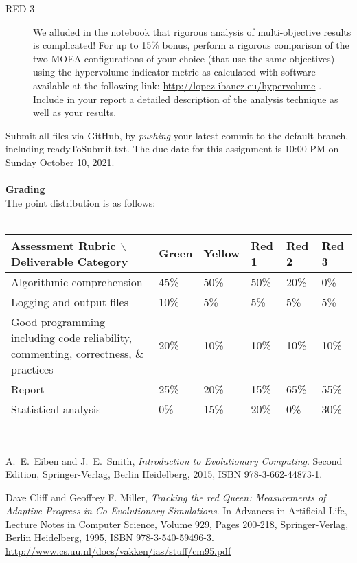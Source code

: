 \documentclass{article}
\begin{document}
\begin{description}
\item[RED 3] We alluded in the notebook that rigorous analysis of multi-objective results is complicated! For up to 15\% bonus, perform a rigorous comparison of the two MOEA configurations of your choice (that use the same objectives) using the hypervolume indicator metric as calculated with software available at the following link: \url{http://lopez-ibanez.eu/hypervolume} . Include in your report a detailed description of the analysis technique as well as your results.
\end{description}
Submit all files via GitHub, by \emph{pushing} your latest commit to the default branch, including readyToSubmit.txt. The due date for this assignment is 10:00 PM on Sunday October 10, 2021.
\\
\\
\textbf{Grading}\\
The point distribution is as follows:\\
\\
\begin{tabular}{p{20em}|l|l|l|l|l|}
  Assessment Rubric $\backslash$ Deliverable Category   & Green     & Yellow        & Red 1     & Red 2     & Red 3\\ \hline \hline  
  Algorithmic comprehension                             & 45\%      & 50\%          & 50\%      & 20\%      & 0\%\\
  \hline Logging and output files                       & 10\%      & 5\%           & 5\%       & 5\%       & 5\%\\
  \hline Good programming including code reliability, commenting, correctness, \& practices      & 20\%  & 10\% & 10\%  & 10\%   & 10\%\\
  \hline Report                                         & 25\%      & 20\%          & 15\%      & 65\%      & 55\%\\
  \hline Statistical analysis                           & 0\%       & 15\%          & 20\%      & 0\%       & 30\%\\
\end{tabular}\\

\newpage
\begin{thebibliography}{10}

A.~E.~Eiben and J.~E.~Smith, \textit{Introduction to Evolutionary Computing}. Second Edition, Springer-Verlag, Berlin Heidelberg, 2015, ISBN 978-3-662-44873-1.

Dave Cliff and Geoffrey F. Miller, \textit{Tracking the red Queen: Measurements of Adaptive Progress in Co-Evolutionary Simulations}. In Advances in Artificial Life, Lecture Notes in Computer Science, Volume 929, Pages 200-218, Springer-Verlag, Berlin Heidelberg, 1995, ISBN 978-3-540-59496-3. \url{http://www.cs.uu.nl/docs/vakken/ias/stuff/cm95.pdf}

\end{thebibliography}
\end{document}
